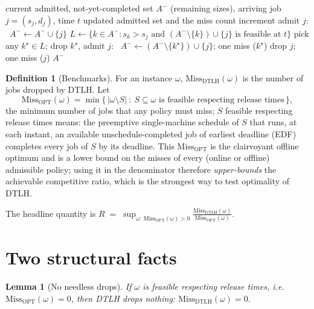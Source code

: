 \documentclass{amsart}
\newtheorem{lemma}[theorem]{Lemma}
\theoremstyle{definition}
\newtheorem{definition}[theorem]{Definition}
\begin{document}
\begin{algorithm}[h]
\caption{DTLH admission decision at the arrival of job $j$ at time $t$}
\label{alg:dtlh}
\begin{algorithmic}[1]
\Require current admitted, not-yet-completed set $A^-$ (remaining sizes), arriving job $j=(s_j,d_j)$, time $t$
\Ensure updated admitted set and the miss count increment
  \State admit $j$: \ $A^-\gets A^-\cup\{j\}$
\Else
  \State $L\gets\{k\in A^- : s_k> s_j \text{ and } (A^-\setminus\{k\})\cup\{j\}\text{ is feasible at }t\}$
    \State pick any $k^\star\in L$; drop $k^\star$, admit $j$: \ $A^-\gets(A^-\setminus\{k^\star\})\cup\{j\}$; one miss ($k^\star$)
  \Else
    \State drop $j$; one miss ($j$)
  \EndIf
\EndIf
\State \Return $A^-$
\end{algorithmic}
\end{algorithm}

\begin{definition}[Benchmarks]
For an instance $\omega$, $\mathrm{Miss}_{\mathrm{DTLH}}(\omega)$ is the number
of jobs dropped by DTLH. Let
\begin{equation}\label{eq:opt}
\mathrm{Miss}_{\mathrm{OPT}}(\omega)
=\min\Big\{\,|\omega\setminus S|\ :\ S\subseteq\omega \text{ is feasible respecting release times}\,\Big\},
\end{equation}
the minimum number of jobs that any policy must miss; $S$ feasible respecting
release times means: the preemptive single-machine schedule of $S$ that runs, at
each instant, an available unschedule-completed job of earliest deadline (EDF)
completes every job of $S$ by its deadline. This $\mathrm{Miss}_{\mathrm{OPT}}$
is the clairvoyant offline optimum and is a lower bound on the misses of every
(online or offline) admissible policy; using it in the denominator therefore
\emph{upper-bounds} the achievable competitive ratio, which is the strongest way
to test optimality of DTLH.
\end{definition}

The headline quantity is
\(
R \;=\; \sup_{\omega:\ \mathrm{Miss}_{\mathrm{OPT}}(\omega)>0}
\frac{\mathrm{Miss}_{\mathrm{DTLH}}(\omega)}{\mathrm{Miss}_{\mathrm{OPT}}(\omega)} .
\)

\section{Two structural facts}

\begin{lemma}[No needless drops]\label{lem:nowaste}
If $\omega$ is feasible respecting release times, i.e.\
$\mathrm{Miss}_{\mathrm{OPT}}(\omega)=0$, then DTLH drops nothing:
$\mathrm{Miss}_{\mathrm{DTLH}}(\omega)=0$.
\end{lemma}
\end{document}
